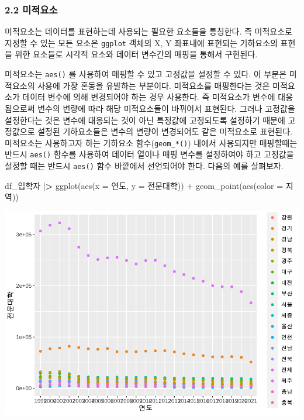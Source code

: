 \documentclass[
]{article}
\newenvironment{Shaded}{\begin{snugshade}}{\end{snugshade}}
\newcommand{\AttributeTok}[1]{\textcolor[rgb]{0.77,0.63,0.00}{#1}}
\newcommand{\ErrorTok}[1]{\textcolor[rgb]{0.64,0.00,0.00}{\textbf{#1}}}
\newcommand{\FunctionTok}[1]{\textcolor[rgb]{0.00,0.00,0.00}{#1}}
\newcommand{\NormalTok}[1]{#1}
\newcommand{\SpecialCharTok}[1]{\textcolor[rgb]{0.00,0.00,0.00}{#1}}
\begin{document}
\hypertarget{uxbbf8uxc801uxc694uxc18c}{%
\subsubsection{2.2 미적요소}\label{uxbbf8uxc801uxc694uxc18c}}

미적요소는 데이터를 표현하는데 사용되는 필요한 요소들을 통칭한다. 즉 미적요소로 지정할 수 있는 모든 요소은 \texttt{ggplot} 객체의 X, Y 좌표내에 표현되는 기하요소의 표현을 위한 요소들로 시각적 요소와 데이터 변수간의 매핑을 통해서 구현된다.

미적요소는 \texttt{aes()} 를 사용하여 매핑할 수 있고 고정값을 설정할 수 있다. 이 부분은 미적요소의 사용에 가장 혼동을 유발하는 부분이다. 미적요소를 매핑한다는 것은 미적요소가 데이터 변수에 의해 변경되어야 하는 경우 사용한다. 즉 미적요소가 변수에 대응됨으로써 변수의 변량에 따라 해당 미적요소들이 바뀌어서 표현된다. 그러나 고정값을 설정한다는 것은 변수에 대응되는 것이 아닌 특정값에 고정되도록 설정하기 때문에 고정값으로 설정된 기하요소들은 변수의 변량이 변경되어도 같은 미적요소로 표현된다. 미적요소는 사용하고자 하는 기하요소 함수(\texttt{geom\_*()}) 내에서 사용되지만 매핑할때는 반드시 \texttt{aes()} 함수를 사용하여 데이터 열이나 매핑 변수를 설정하여야 하고 고정값을 설정할 때는 반드시 \texttt{aes()} 함수 바깥에서 선언되어야 한다. 다음의 예를 살펴보자.

\begin{Shaded}
\begin{Highlighting}[]
\NormalTok{df\_입학자 }\SpecialCharTok{|}\ErrorTok{\textgreater{}} \FunctionTok{ggplot}\NormalTok{(}\FunctionTok{aes}\NormalTok{(}\AttributeTok{x =}\NormalTok{ 연도, }\AttributeTok{y =}\NormalTok{ 전문대학)) }\SpecialCharTok{+}
  \FunctionTok{geom\_point}\NormalTok{(}\FunctionTok{aes}\NormalTok{(}\AttributeTok{color =}\NormalTok{ 지역))}
\end{Highlighting}
\end{Shaded}

\includegraphics{chap3_files/figure-latex/unnamed-chunk-6-1.pdf}
\end{document}
